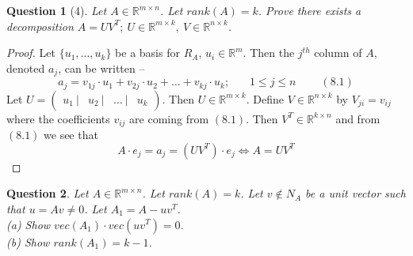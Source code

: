 \documentclass[11pt]{article}
\theoremstyle{quest}
\newtheorem*{question}{Question}
\begin{document}
\begin{question}[4]
Let $A \in \mathbb{R}^{m \times n}$. Let $rank(A) = k$. Prove there exists a decomposition $A = UV^T;\ U \in \mathbb{R}^{m \times k},\ V \in \mathbb{R}^{n \times k}$.
\end{question}
\begin{proof}
Let $\{u_1, \ldots, u_k\}$ be a basis for $R_A$, $u_i \in \mathbb{R}^m$. Then the $j^{th}$ column of $A$, denoted $a_j$, can be written --
$$a_j = v_{1j} \cdot u_1 + v_{2j} \cdot u_2 + \ldots + v_{kj} \cdot u_k;\ \ \ \ \ \ \ \ 1 \le j \le n\ \ \ \ \ \ \ \ \ \ (8.1)$$
Let $U = \begin{pmatrix}
u_1\ | & u_2\ | & \ldots\ | & u_k
\end{pmatrix}$. Then $U \in \mathbb{R}^{m \times k}$. Define $V \in \mathbb{R}^{n \times k}$ by $V_{ji} = v_{ij}$ where the coefficients $v_{ij}$ are coming from $(8.1)$. Then $V^T \in \mathbb{R}^{k \times n}$ and from $(8.1)$ we see that
$$A \cdot e_j = a_j = (UV^T) \cdot e_j \iff A = UV^T$$
\end{proof}
\begin{question}
Let $A \in \mathbb{R}^{m \times n}$. Let $rank(A) = k$. Let $v \not \in N_A$ be a unit vector such that $u = Av \ne 0$. Let $A_1 = A - uv^T$.
\\(a) Show $vec(A_1) \cdot vec(uv^T) = 0$.
\\(b) Show $rank(A_1) = k-1$.
\end{question}
\end{document}
